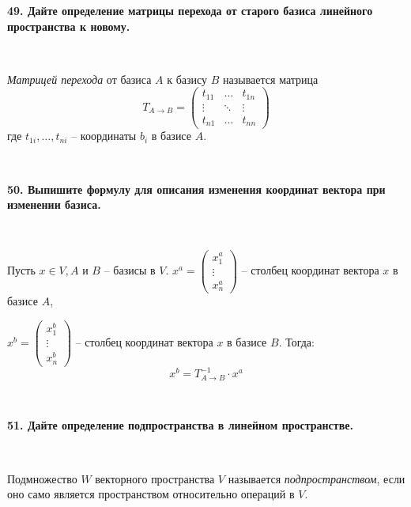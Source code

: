 \documentclass{article}
\begin{document}
    \textbf{49. Дайте определение матрицы перехода от старого базиса линейного пространства к новому.}

    {
        $\;$
        \setlength{\parindent}{0.4cm}
        \hangindent=0.4cm

    \textit{Матрицей перехода} от базиса $A$ к базису $B$ называется матрица
        \[
            T_{A\rightarrow B}=\begin{pmatrix}
                                   t_{11} & \ldots & t_{1n} \\
                                   \vdots & \ddots & \vdots \\
                                   t_{n1} & \ldots & t_{nn}
            \end{pmatrix}
        \]
        где $t_{1i}, \ldots, t_{ni}$ -- координаты $b_i$ в базисе $A$.

        $\;$
        \setlength{\parindent}{0cm}
        \hangindent=0cm
    }

    \newpage

    \textbf{50. Выпишите формулу для описания изменения координат вектора при изменении базиса.}

    {
        $\;$
        \setlength{\parindent}{0.4cm}
        \hangindent=0.4cm

    Пусть $x\in V, A$ и $B$ -- базисы в $V$. $x^a=\begin{pmatrix}
                                                      x_1^a  \\
                                                      \vdots \\
                                                      x_n^a
    \end{pmatrix}$ -- столбец координат вектора $x$ в базисе $A$,

        $x^b=\begin{pmatrix}
                 x_1^b  \\
                 \vdots \\
                 x_n^b
        \end{pmatrix}$ -- столбец координат вектора $x$ в базисе $B$. Тогда: $$x^b=T_{A\rightarrow B}^{-1}\cdot x^a$$

        $\;$
        \setlength{\parindent}{0cm}
        \hangindent=0cm
    }

    \textbf{51. Дайте определение подпространства в линейном пространстве.}

    {
        $\;$
        \setlength{\parindent}{0.4cm}
        \hangindent=0.4cm

    Подмножество $W$ векторного пространства $V$ называется \textit{подпространством}, если оно само является пространством относительно операций в $V$.

        $\;$
        \setlength{\parindent}{0cm}
        \hangindent=0cm
    }
\end{document}
